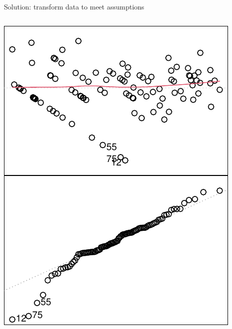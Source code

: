 \documentclass[
  ignorenonframetext,
  aspectratio=169]{beamer}
\begin{document}
\begin{frame}[fragile]{Solution: transform data to meet assumptions}
\begin{columns}[T]
\begin{column}{0.48\textwidth}
\includegraphics{03-Lecture_files/figure-beamer/unnamed-chunk-38-1.pdf}
\end{column}
\end{columns}
\end{frame}
\end{document}
